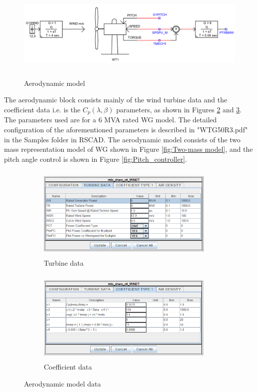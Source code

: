 \begin{figure}[]
\centering
    \includegraphics[height = 4.5cm,width = 15.5cm]{Diagrams/Appendix_A/Aerodynamic_model.PNG}
    \caption{Aerodynamic model}
    \label{fig:Aerodynamic_model}
\end{figure}

The aerodynamic block consists mainly of the wind turbine data and the coefficient data i.e. is the $C_p(\lambda,\beta)$ parameters, as shown in Figures \ref{fig:Turbine_data} and \ref{fig:Coeff_type}. The parameters used are for a 6 MVA rated \gls{WG} model. The detailed configuration of the aforementioned parameters is described in "WTG50R3.pdf" in the Samples folder in RSCAD. The aerodynamic model consists of the two mass representation model of \gls{WG} shown in Figure \ref{fig:Two-mass model}, and the pitch angle control is shown in Figure \ref{fig:Pitch_controller}. 

\begin{figure}[H]
\centering
\begin{subfigure}{.55\textwidth}
  \centering
  \includegraphics[height=4.5cm,width=8.5cm]{Diagrams/Appendix_A/Turbine_data.PNG}
  \caption{Turbine data}
  \label{fig:Turbine_data}
\end{subfigure}%
\begin{subfigure}{.45\textwidth}
  \centering
  \includegraphics[height=4.5cm,width=8.5cm]{Diagrams/Appendix_A/Coeff_type.PNG}
  \caption{Coefficient data}
  \label{fig:Coeff_type}
\end{subfigure}
\caption{Aerodynamic model data}
\label{fig:aerodynamic_model_data}
\end{figure}

